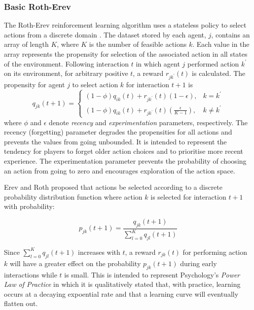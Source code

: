 \subsubsection{Basic Roth-Erev}
\label{sec:rotherev}
The Roth-Erev reinforcement learning algorithm uses a stateless policy to
select actions from a discrete domain \cite{roth:games,roth:aer}.  The dataset
stored by each agent, $j$, contains an array of length $K$, where $K$ is the
number of feasible actions $k$.  Each value in the array represents the
propensity for selection of the associated action in all states of the
environment.  Following interaction $t$ in which agent $j$ performed action
$k^\prime$ on its environment, for arbitrary positive $t$, a reward
$r_{jk^\prime}(t)$ is calculated.  The propensity for agent $j$ to select
action $k$ for interaction $t+1$ is
\begin{equation}
q_{jk}(t+1) =
\begin{cases}
(1-\phi)q_{ik}(t) + r_{jk^\prime}(t)(1-\epsilon), & \text{$k = k^\prime$} \\
(1-\phi)q_{ik}(t) + r_{jk^\prime}(t)(\frac{\epsilon}{K-1}), & \text{$k \ne
k^\prime$}
\end{cases}
\end{equation}
where $\phi$ and $\epsilon$ denote \textit{recency} and
\textit{experimentation} parameters, respectively.  The recency (forgetting)
parameter degrades the propensities for all actions and prevents the values
from going unbounded.  It is intended to represent the tendency for players to
forget older action choices and to prioritise more recent experience.  The
experimentation parameter prevents the probability of choosing an action from
going to zero and encourages exploration of the action space.

Erev and Roth proposed that actions be selected according to a discrete
probability distribution function where action $k$ is selected for interaction
$t+1$ with probability:

\begin{equation}
p_{jk}(t+1) = \frac{q_{jk}(t+1)}{\sum_{l=0}^K q_{jl}(t+1)}
\end{equation}

Since $\sum_{l=0}^K q_{jl}(t+1)$ increases with $t$, a reward $r_{jk}(t)$ for
performing action $k$ will have a greater effect on the probability
$p_{jk}(t+1)$ during early interactions while $t$ is small.  This is intended
to represent Psychology's \textit{Power Law of Practice} in which it is
qualitatively stated that, with practice, learning occurs at a decaying
expoential rate and that a learning curve will eventually flatten out.


